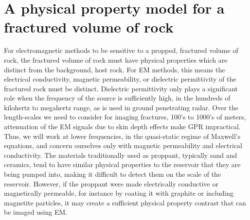 
\chapter{A physical property model for a fractured volume of rock}
\label{ch:phys_prop_model}

For electromagnetic methods to be sensitive to a propped, fractured volume of rock, the fractured volume of rock must have physical properties which are distinct from the background, host rock. For EM methods, this means the electrical conductivity, magnetic permeability, or dielectric permittivity of the fractured rock must be distinct. Dielectric permittivity only plays a significant role when the frequency of the source is sufficiently high, in the hundreds of kilohertz to megahertz range, as is used in ground penetrating radar. Over the length-scales we need to consider for imaging fractures, 100’s to 1000’s of meters, attenuation of the EM signals due to skin depth effects make GPR impractical. Thus, we will work at lower frequencies, in the quasi-static regime of Maxwell's equations, and concern ourselves only with magnetic permeability and electrical conductivity. The materials traditionally used as proppant, typically sand and ceramics, tend to have similar physical properties to the reservoir that they are being pumped into, making it difficult to detect them on the scale of the reservoir. However, if the proppant were made electrically conductive or magnetically permeable, for instance by coating it with graphite or including magnetite particles, it may create a sufficient physical property contrast that can be imaged using EM.

